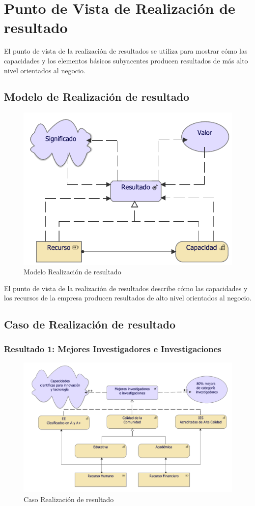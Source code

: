 \section{Punto de Vista de Realización de resultado}

El punto de vista de la realización de resultados se utiliza para mostrar cómo las capacidades y los elementos básicos subyacentes producen resultados de más alto nivel orientados al negocio.

\subsection{Modelo de Realización de resultado}
\begin{figure}[h!]
	\centering
	\includegraphics[width=.5\linewidth]{imgs/caso/RealResultado.pdf}
	\caption{Modelo Realización de resultado}
\end{figure}

El punto de vista de la realización de resultados describe cómo las capacidades y los recursos de la empresa producen resultados de alto nivel orientados al negocio.

\newpage

\subsection{Caso de Realización de resultado}

\subsubsection{Resultado 1: Mejores Investigadores e Investigaciones}

\begin{figure}[h!]
	\centering
	\includegraphics[width=.8\linewidth]{imgs/modelo/estrategia/resultado/resultado_2.pdf}
	\caption{Caso Realización de resultado}
\end{figure}

